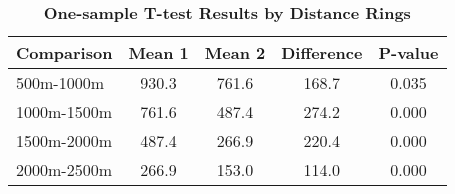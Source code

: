 \begin{table}[htbp]
\centering
\begin{tabular}{l|c c c c}
\hline
Comparison & Mean 1 & Mean 2 & Difference & P-value \\
\hline
500m-1000m & 930.3 & 761.6 & 168.7 & 0.035 \\
1000m-1500m & 761.6 & 487.4 & 274.2 & 0.000 \\
1500m-2000m & 487.4 & 266.9 & 220.4 & 0.000 \\
2000m-2500m & 266.9 & 153.0 & 114.0 & 0.000 \\
\hline
\end{tabular}
\caption{\textbf{One-sample T-test Results by Distance Rings}}
\label{tab:ttests}
\end{table}

